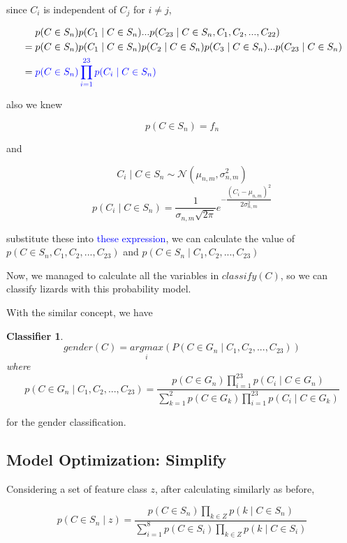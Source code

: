 \documentclass[12pt]{article}
\newtheorem{classifier}{Classifier}
\begin{document}
		\noindent since $C_i$ is independent of $C_j$ for $i \neq j$,
		
		\begin{align*}
			&\quad \ p(C \in S_n)p(C_1 \mid C \in S_n)...p(C_{23} \mid C \in S_n, C_1, C_2, ..., C_{22}) \\
			&=p(C \in S_n)p(C_1 \mid C \in S_n)p(C_2 \mid C \in S_n)p(C_3 \mid C \in S_n)...p(C_{23} \mid C \in S_n) \\
			&=\textcolor{blue}{p(C \in S_n)\prod_{i=1}^{23}p(C_i \mid C \in S_n)}
		\end{align*}
		
		\noindent also we knew
		
		$$p(C \in S_n) = f_n$$
		
		\noindent and
		
		$$C_i \mid C \in S_n \sim \mathcal{N}(\mu_{n, m}, \sigma_{n, m}^2)$$
		$$p(C_i \mid C \in S_n)=\dfrac{1}{\sigma_{n, m}\sqrt{2\pi}}e^{-\dfrac{(C_i-\mu_{n, m})^2}{2\sigma_{n, m}^2}}$$
		
		\noindent substitute these into \textcolor{blue}{these expression},
		we can calculate the value of
		$p(C \in S_n, C_1, C_2, ..., C_{23})$ and $p(C \in S_n \mid C_1, C_2, ..., C_{23})$
		
		Now, we managed to calculate all the variables in $classify(C)$, so we can
		classify lizards with this probability model.
		
		With the similar concept, we have
		
		\begin{classifier}
			$$gender(C)=\underset{i}{argmax}(P(C \in G_n \mid C_1, C_2, ..., C_{23}))$$
			where
			$$p(C \in G_n \mid C_1, C_2, ..., C_{23})
			= \dfrac{p(C \in G_n) \prod_{i = 1}^{23} p(C_i \mid C \in G_n)}{\sum_{k = 1}^2
			p(C \in G_k) \prod_{i = 1}^{23} p(C_i \mid C \in G_k)}$$
		\end{classifier}
		
		\noindent for the gender classification.
		
	\subsection{Model Optimization: Simplify}
		
		Considering a set of feature class $z$, after calculating similarly as before,
		
		$$p(C \in S_n \mid z) = \dfrac{p(C \in S_n)\prod_{k \in Z}p(k \mid C \in S_n)}{\sum_{i = 1}^8 p(C \in S_i)\prod_{k \in Z}p(k \mid C \in S_i)}$$
		
\end{document}
